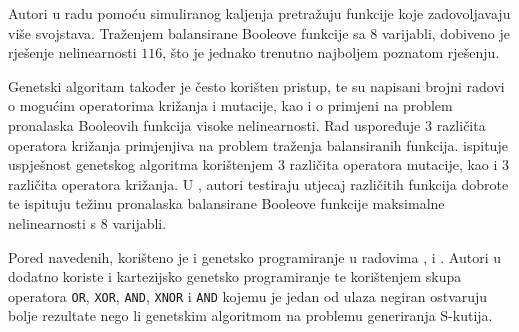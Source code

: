 Autori u radu \cite{EvolvingBoolean} pomoću simuliranog kaljenja  \cite{SimulatedAnnealing} pretražuju funkcije koje zadovoljavaju više svojstava.
Traženjem balansirane Booleove funkcije sa 8 varijabli, dobiveno je rješenje nelinearnosti $116$, što je jednako trenutno najboljem poznatom rješenju.

Genetski algoritam \cite{holland1992adaptation} također je često korišten pristup, te su napisani brojni radovi o mogućim operatorima križanja i mutacije, kao i o primjeni na problem pronalaska Booleovih funkcija visoke nelinearnosti.
Rad \cite{manzoni2019balanced} uspoređuje $3$ različita operatora križanja primjenjiva na problem traženja balansiranih funkcija.
\cite{picek2014using} ispituje uspješnost genetskog algoritma korištenjem $3$ različita operatora mutacije, kao i $3$ različita operatora križanja.
U \cite{MaximalNonlinearity}, autori testiraju utjecaj različitih funkcija dobrote te ispituju težinu pronalaska balansirane Booleove funkcije maksimalne nelinearnosti s 8 varijabli.

Pored navedenih, korišteno je i genetsko programiranje \cite{koza1992genetic} u radovima \cite{picek2015cartesian}, \cite{picek2013evolving} i \cite{tesavr2010new}.
Autori u \cite{picek2015cartesian} dodatno koriste i kartezijsko genetsko programiranje te korištenjem skupa operatora \texttt{OR}, \texttt{XOR}, \texttt{AND}, \texttt{XNOR} i \texttt{AND} kojemu je jedan od ulaza negiran ostvaruju bolje rezultate nego li genetskim algoritmom na problemu generiranja S-kutija. 
